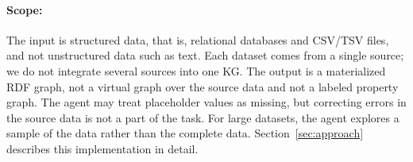 \paragraph{Scope:}
The input is structured data, that is, relational databases and CSV/TSV files, and not unstructured data such as text. Each dataset comes from a single source; we do not integrate several sources into one KG\@. The output is a materialized RDF graph, not a virtual graph over the source data and not a labeled property graph. The agent may treat placeholder values as missing, but correcting errors in the source data is not a part of the task. For large datasets, the agent explores a sample of the data rather than the complete data. Section~\ref{sec:approach} describes this implementation in detail. 
